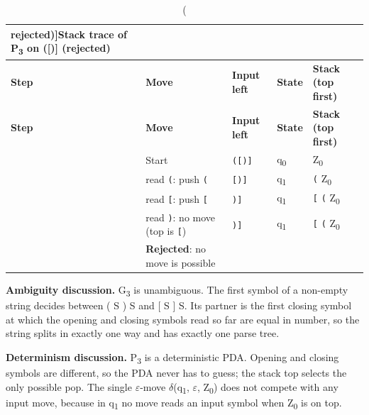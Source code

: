 \documentclass[12pt,a4paper]{article}
\begin{document}
{\footnotesize
\begin{longtable}{|>{\centering\arraybackslash}p{}|>{\raggedright\arraybackslash}p{}|>{\raggedright\arraybackslash}p{}|>{\centering\arraybackslash}p{}|>{\raggedright\arraybackslash}p{}|}
\caption[Stack trace of P3 on ([)] (rejected)]{Stack trace of P\textsubscript{3} on ([)] (rejected)}\label{tab:bal_tr2}\\
\hline
\rowcolor{hdr}\textbf{Step} & \textbf{Move} & \textbf{Input left} & \textbf{State} & \textbf{Stack (top first)}\\ \hline
\endfirsthead
\hline
\rowcolor{hdr}\textbf{Step} & \textbf{Move} & \textbf{Input left} & \textbf{State} & \textbf{Stack (top first)}\\ \hline
\endhead
0 & Start & \texttt{([)]} & q\textsubscript{0} & Z\textsubscript{0}\\ \hline
1 & read \texttt{(}: push \texttt{(} & \texttt{[)]} & q\textsubscript{1} & \texttt{(}  Z\textsubscript{0}\\ \hline
2 & read \texttt{[}: push \texttt{[} & \texttt{)]} & q\textsubscript{1} & \texttt{[}  \texttt{(}  Z\textsubscript{0}\\ \hline
3 & read \texttt{)}: no move (top is \texttt{[}) & \texttt{)]} & q\textsubscript{1} & \texttt{[}  \texttt{(}  Z\textsubscript{0}\\ \hline
 & \textbf{Rejected}: no move is possible &  &  & \\ \hline
\end{longtable}}

\textbf{Ambiguity discussion.} G\textsubscript{3} is unambiguous. The first symbol of a non-empty string decides between ( S ) S and [ S ] S. Its partner is the first closing symbol at which the opening and closing symbols read so far are equal in number, so the string splits in exactly one way and has exactly one parse tree.

\textbf{Determinism discussion.} P\textsubscript{3} is a deterministic PDA. Opening and closing symbols are different, so the PDA never has to guess; the stack top selects the only possible pop. The single \ensuremath{\varepsilon}-move \ensuremath{\delta}(q\textsubscript{1}, \ensuremath{\varepsilon}, Z\textsubscript{0}) does not compete with any input move, because in q\textsubscript{1} no move reads an input symbol when Z\textsubscript{0} is on top.
\end{document}
